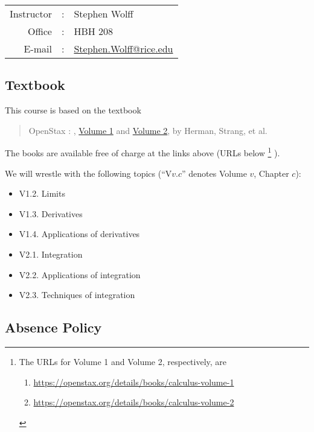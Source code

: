 \begin{tabular}{r c l}
Instructor	&	:	&	Stephen Wolff	\\
Office 	&	:	&	HBH 208	\\
E-mail	&	:	&	\href{mailto:Stephen.Wolff@rice.edu?subject=[Math\%20112]}{Stephen.Wolff@rice.edu}
\end{tabular}



\subsection{Textbook}

This course is based on the textbook
\begin{quote}
OpenStax : , \href{https://openstax.org/details/books/calculus-volume-1}{Volume 1} and \href{https://openstax.org/details/books/calculus-volume-2}{Volume 2}, by Herman, Strang, et al.
\end{quote}
The books are available free of charge at the links above (URLs below%
\footnote{The URLs for Volume 1 and Volume 2, respectively, are
\begin{enumerate}
\item \url{https://openstax.org/details/books/calculus-volume-1}
\item \url{https://openstax.org/details/books/calculus-volume-2}
\end{enumerate}}%
).

We will wrestle with the following topics (``V$v$.$c$'' denotes Volume $v$, Chapter $c$):
\begin{multicols}{2}
\begin{itemize}
\item V1.2. Limits
\item V1.3. Derivatives
\item V1.4. Applications of derivatives
\item V2.1. Integration
\item V2.2. Applications of integration
\item V2.3. Techniques of integration
\end{itemize}
\end{multicols}





\subsection{Absence Policy}

